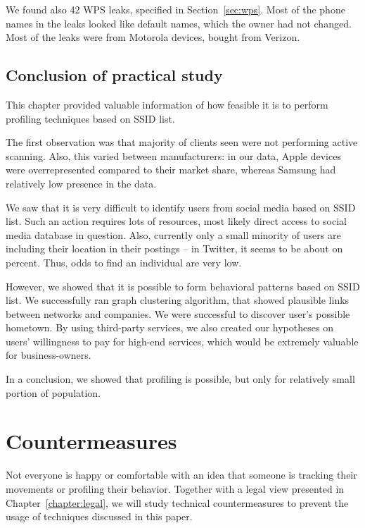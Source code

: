 \documentclass[12pt,a4paper,oneside,pdftex]{report}
\begin{document}
We found also 42 WPS leaks, specified in Section~\ref{sec:wps}. Most of the phone names in the leaks looked like default names, which the owner had not changed. Most of the leaks were from Motorola devices, bought from Verizon.


\section{Conclusion of practical study}
\label{sec:practical_conclusion}

This chapter provided valuable information of how feasible it is to perform profiling techniques based on SSID list.

The first observation was that majority of clients seen were not performing active scanning. Also, this varied between manufacturers: in our data, Apple devices were overrepresented compared to their market share, whereas Samsung had relatively low presence in the data.

We saw that it is very difficult to identify users from social media based on SSID list. Such an action requires lots of resources, most likely direct access to social media database in question. Also, currently only a small minority of users are including their location in their postings -- in Twitter, it seems to be about on percent. Thus, odds to find an individual are very low.

However, we showed that it is possible to form behavioral patterns based on SSID list. We successfully ran graph clustering algorithm, that showed plausible links between networks and companies. We were successful to discover user's possible hometown. By using third-party services, we also created our hypotheses on users' willingness to pay for high-end services, which would be extremely valuable for business-owners.

In a conclusion, we showed that profiling is possible, but only for relatively small portion of population.



\chapter{Countermeasures}
\label{chapter:countermeasures}

Not everyone is happy or comfortable with an idea that someone is tracking their movements or profiling their behavior. Together with a legal view presented in Chapter~\ref{chapter:legal}, we will study technical countermeasures to prevent the usage of techniques discussed in this paper. 
\end{document}
